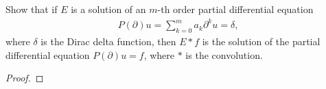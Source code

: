 \begin{problem}{9}
  Show that if $E$ is a solution of an $m$-th order partial differential equation
  \begin{align*}
    P(\partial)u = \sum_{k=0}^m a_k \partial^k u = \delta,
  \end{align*}
  where $\delta$ is the Dirac delta function, then $E \ast f$ is the solution of
  the partial differential equation $P(\partial)u = f$, where $\ast$ is the convolution.
\end{problem}

\begin{proof}
\end{proof}
\newpage
